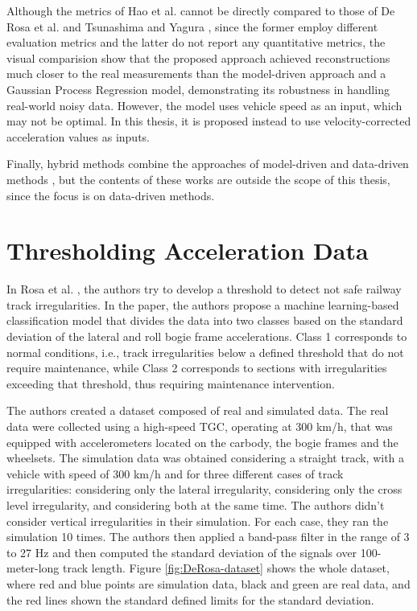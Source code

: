 Although the metrics of Hao et al. \cite{Hao02012023} cannot be directly compared to those of De Rosa et al. \cite{DEROSA2019606} and Tsunashima and Yagura \cite{vibration7040049}, since the former employ different evaluation metrics and the latter do not report any quantitative metrics, the visual comparision show that the proposed approach achieved reconstructions much closer to the real measurements than the model-driven approach and a Gaussian Process Regression model, demonstrating its robustness in handling real-world noisy data. However, the model uses vehicle speed as an input, which may not be optimal. In this thesis, it is proposed instead to use velocity-corrected acceleration values as inputs.

Finally, hybrid methods combine the approaches of model-driven and data-driven methods \cite{Sansinena26032025}, but the contents of these works are outside the scope of this thesis, since the focus is on data-driven methods.

\section{Thresholding Acceleration Data} \label{sec-thresholding-acceleration}

In Rosa et al. \cite{DeRosa2021}, the authors try to develop a threshold to detect not safe railway track irregularities. In the paper, the authors propose a machine learning-based classification model that divides the data into two classes based on the standard deviation of the lateral and roll bogie frame accelerations. Class 1 corresponds to normal conditions, i.e., track irregularities below a defined threshold that do not require maintenance, while Class 2 corresponds to sections with irregularities exceeding that threshold, thus requiring maintenance intervention. 

The authors created a dataset composed of real and simulated data. The real data were collected using a high-speed TGC, operating at 300 km/h, that was equipped with accelerometers located on the carbody, the bogie frames and the wheelsets. The simulation data was obtained considering a straight track, with a vehicle with speed of 300 km/h and for three different cases of track irregularities: considering only the lateral irregularity, considering only the cross level irregularity, and considering both at the same time. The authors didn't consider vertical irregularities in their simulation. For each case, they ran the simulation 10 times. The authors then applied a band-pass filter in the range of 3 to 27 Hz and then computed the standard deviation of the signals over 100-meter-long track length. Figure \ref{fig:DeRosa-dataset} shows the whole dataset, where red and blue points are simulation data, black and green are real data, and the red lines shown the standard defined limits for the standard deviation.

